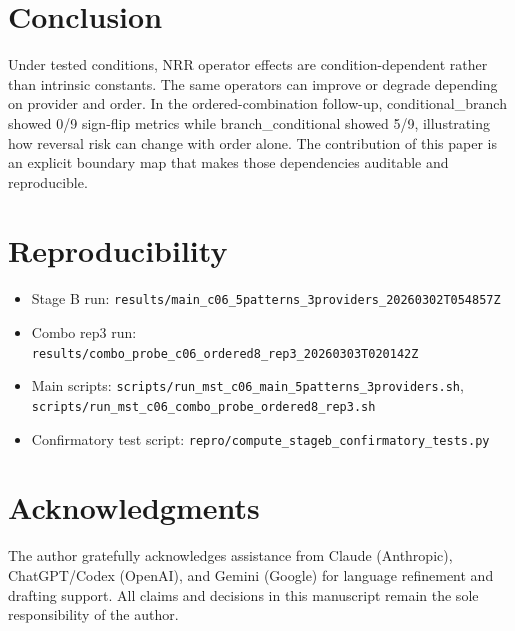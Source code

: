 \documentclass[11pt,a4paper]{article}
\begin{document}
\section{Conclusion}
\label{sec:conclusion}

Under tested conditions, NRR operator effects are condition-dependent rather than intrinsic constants. The same operators can improve or degrade depending on provider and order. In the ordered-combination follow-up, conditional\_branch showed 0/9 sign-flip metrics while branch\_conditional showed 5/9, illustrating how reversal risk can change with order alone. The contribution of this paper is an explicit boundary map that makes those dependencies auditable and reproducible.

\section{Reproducibility}
\label{sec:repro}

\begin{itemize}
  \item Stage B run: \texttt{results/main\_c06\_5patterns\_3providers\_20260302T054857Z}
  \item Combo rep3 run: \texttt{results/combo\_probe\_c06\_ordered8\_rep3\_20260303T020142Z}
  \item Main scripts: \texttt{scripts/run\_mst\_c06\_main\_5patterns\_3providers.sh}, \texttt{scripts/run\_mst\_c06\_combo\_probe\_ordered8\_rep3.sh}
  \item Confirmatory test script: \texttt{repro/compute\_stageb\_confirmatory\_tests.py}
\end{itemize}

\section*{Acknowledgments}
The author gratefully acknowledges assistance from Claude (Anthropic), ChatGPT/Codex (OpenAI), and Gemini (Google) for language refinement and drafting support. All claims and decisions in this manuscript remain the sole responsibility of the author.
\end{document}
